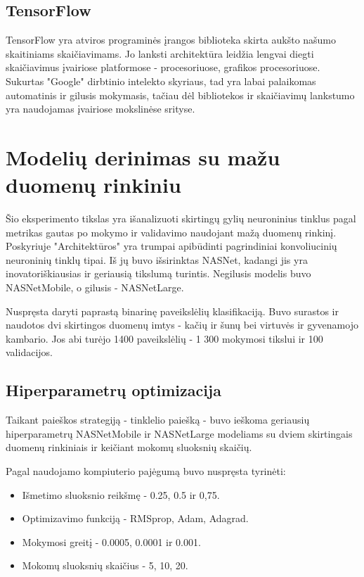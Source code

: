 \documentclass{VUMIFPSbakalaurinis}
\begin{document}
\subsection{TensorFlow}
TensorFlow yra atviros programinės įrangos biblioteka skirta aukšto našumo skaitiniams skaičiavimams. Jo lanksti architektūra leidžia lengvai diegti skaičiavimus įvairiose 
platformose - procesoriuose, grafikos procesoriuose. Sukurtas "Google" dirbtinio intelekto skyriaus, tad yra labai palaikomas automatinis ir gilusis mokymasis, tačiau 
dėl bibliotekos ir skaičiavimų lankstumo yra naudojamas įvairiose mokslinėse srityse.

\section{Modelių derinimas su mažu duomenų rinkiniu} 
Šio eksperimento tikslas yra išanalizuoti skirtingų gylių neuroninius tinklus pagal metrikas gautas po mokymo ir validavimo naudojant mažą duomenų rinkinį. 
Poskyriuje "Architektūros" yra trumpai apibūdinti pagrindiniai konvoliucinių neuroninių tinklų tipai. 
Iš jų buvo išsirinktas NASNet, kadangi jis yra inovatoriškiausias ir geriausią tikslumą turintis. Negilusis modelis buvo NASNetMobile, o gilusis - NASNetLarge.

Nuspręsta daryti paprastą binarinę paveikslėlių klasifikaciją.
Buvo surastos ir naudotos dvi skirtingos duomenų imtys - kačių ir šunų bei virtuvės ir gyvenamojo kambario. Jos abi turėjo 1400 paveikslėlių - 1 300 mokymosi tikslui ir 100 validacijos.

\subsection{Hiperparametrų optimizacija}

Taikant paieškos strategiją - tinklelio paiešką - buvo ieškoma geriausių hiperparametrų NASNetMobile ir NASNetLarge modeliams su dviem skirtingais duomenų rinkiniais ir keičiant mokomų sluoksnių skaičių.

Pagal naudojamo kompiuterio pajėgumą buvo nuspręsta tyrinėti:
\begin{itemize}
    \item Išmetimo sluoksnio reikšmę - 0.25, 0.5 ir 0,75.
    \item Optimizavimo funkciją - RMSprop, Adam, Adagrad.
    \item Mokymosi greitį - 0.0005, 0.0001 ir 0.001.
    \item Mokomų sluoksnių skaičius - 5, 10, 20.
\end{itemize}
\end{document}
